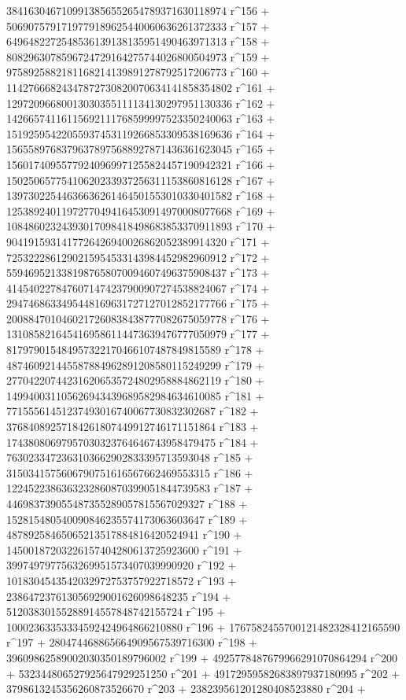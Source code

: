        3841630467109913856552654789371630118974 r^156 + 
       5069075791719779189625440060636261372333 r^157 + 
       6496482272548536139138135951490463971313 r^158 + 
       8082963078596724729164275744026800504973 r^159 + 
       9758925882181168214139891278792517206773 r^160 + 
       11427666824347872730820070634141858354802 r^161 + 
       12972096680013030355111134130297951130336 r^162 + 
       14266574116115692111768599997523350240063 r^163 + 
       15192595422055937453119266853309538169636 r^164 + 
       15655897683796378975688927871436361623045 r^165 + 
       15601740955779240969971255824457190942321 r^166 + 
       15025065775410620233937256311153860816128 r^167 + 
       13973022544636636261464501553010330401582 r^168 + 
       12538924011972770494164530914970008077668 r^169 + 
       10848602324393017098418498683853370911893 r^170 + 
       9041915931417726426940026862052389914320 r^171 + 
       7253222861290215954533143984452982960912 r^172 + 
       5594695213381987658070094607496375908437 r^173 + 
       4145402278476071474237900907274538824067 r^174 + 
       2947468633495448169631727127012852177766 r^175 + 
       2008847010460217260838438777082675059778 r^176 + 
       1310858216454169586114473639476777050979 r^177 + 
       817979015484957322170466107487849815589 r^178 + 
       487460921445587884962891208580115249299 r^179 + 
       277042207442316206535724802958884862119 r^180 + 
       149940031105626943439689582984634610085 r^181 + 
       77155561451237493016740067730832302687 r^182 + 
       37684089257184261807449912746171151864 r^183 + 
       17438080697957030323764646743958479475 r^184 + 
       7630233472363103662902833395713593048 r^185 + 
       3150341575606790751616567662469553315 r^186 + 
       1224522386363232860870399051844739583 r^187 + 
       446983739055487355289057815567029327 r^188 + 
       152815480540090846235574173063603647 r^189 + 
       48789258465065213517884816420524941 r^190 + 
       14500187203226157404280613725923600 r^191 + 
       3997497977563269951573407039990920 r^192 + 
       1018304543542032972753757922718572 r^193 + 
       238647237613056929001626098648235 r^194 + 
       51203830155288914557848742155724 r^195 + 
       10002363353334592424964866210880 r^196 + 
       1767582455700121482328412165590 r^197 + 
       280474468865664909567539716300 r^198 + 
       39609862589002030350189796002 r^199 + 
       4925778487679966291070864294 r^200 + 
       532344806527925647929251250 r^201 + 
       49172959582683897937180995 r^202 + 
       3798613245356260873526670 r^203 + 
       238239561201280408523880 r^204 + 

